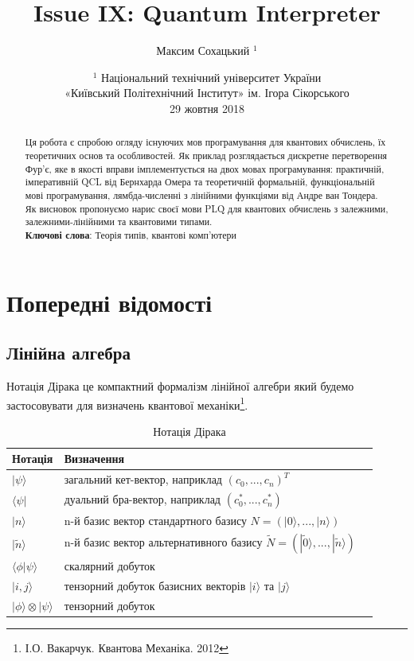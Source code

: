 \documentclass{article}
\theoremstyle{definition}
\begin{document}
\title{Issue IX: Quantum Interpreter}
\author{Максим Сохацький $^1$}
\date{ \small $^1$ Національний технічний університет України \\
       «Київський Політехнічний Інститут» ім. Ігора Сікорського \\
       29 жовтня 2018 }
\maketitle

\begin{abstract}
Ця робота є спробою огляду існуючих мов програмування для квантових обчислень,
їх теоретичних основ та особливостей.
Як приклад розглядається дискретне перетворення Фур'є,
яке в якості вправи імплементується на двох мовах програмування:
практичній, імперативній QCL від Бернхарда Омера\cite{Omer2003} та
теоретичній формальній, функціональній мові програмування, лямбда-численні
з лінійними функціями від Андре ван Тондера\cite{Tonder2004}. Як висновок
пропонуємо нарис своєї мови PLQ для квантових обчислень з залежними,
залежними-лінійними та квантовими типами.
\\
{\bf Ключові слова}: Теорія типів, квантові комп'ютери
\end{abstract}
\tableofcontents

\newpage

\section{Попередні відомості}

\subsection{Лінійна алгебра}
Нотація Дірака це компактний формалізм лінійної алгебри який будемо застосовувати
для визначень квантової механіки\footnote{І.О. Вакарчук. Квантова Механіка. 2012}.

\begin{table}[h]
\centering
  \caption{Нотація Дірака}
 \begin{tabular}{lll}
    \hline
       Нотація & Визначення \\
    \hline
       $|\psi\rangle$ & загальний кет-вектор, наприклад $(c_0,...,c_n)^T$ \\
       $\langle\psi|$ & дуальний бра-вектор, наприклад $(c_0^*,...,c_n^*)$ \\
       $|n\rangle$ & n-й базис вектор стандартного базису $N=(|0\rangle,...,|n\rangle)$\\
       $|\tilde{n}\rangle$ & n-й базис вектор альтернативного базису $\tilde{N}=(|\tilde{0}\rangle,...,|\tilde{n}\rangle)$ \\
       $\langle\phi|\psi\rangle$ & скалярний добуток \\
       $|i,j\rangle$ & тензорний добуток базисних векторів $|i\rangle$ та $|j\rangle$ \\
       $|\phi\rangle\otimes|\psi\rangle$ & тензорний добуток \\
    \hline
  \end{tabular}
\end{table}
\end{document}
